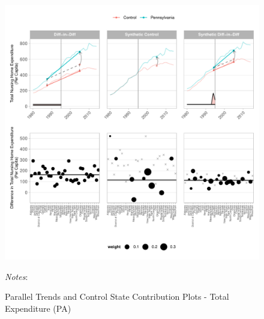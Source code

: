 \documentclass[12pt]{article}
\begin{document}
\newpage
\begin{figure}[t]
	\begin{center}
	\caption{\centering Parallel Trends and Control State Contribution Plots - Total Expenditure (PA)}
    \includegraphics[width=\textwidth,keepaspectratio]{total_expenditure_plots_PA.pdf}
    \end{center}
    \footnotesize
		\textit{Notes}:
\end{figure}
\clearpage
\end{document}
